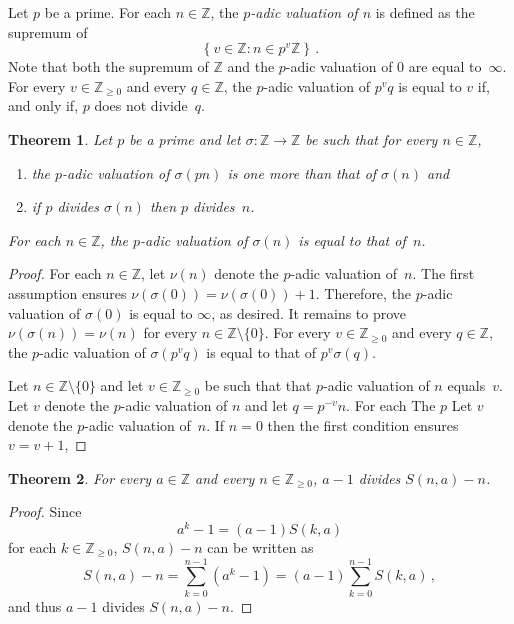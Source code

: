 \documentclass[12pt]{article}
\newcommand{\bZ}{\mathbb{Z}}
\newcommand{\bN}{\bZ_{\ge 0}}%
\newtheorem{theorem}{Theorem}
\theoremstyle{definition}
\begin{document}
Let $p$ be a prime.
For each $n \in \bZ$, the \emph{$p$-adic valuation of $n$} is defined as the supremum of
$$
 \left\{ v \in \bZ : n \in p^v \bZ \right\} \, .
$$
Note that both the supremum of $\bZ$ and the $p$-adic valuation of $0$ are equal to~$\infty$.
For every $v \in \bN$ and every $q \in \bZ$,
the $p$-adic valuation of $p^v q$ is equal to $v$ if, and only if, $p$ does not divide~$q$.

\begin{theorem}
  Let $p$ be a prime and let $\sigma\colon \bZ \to \bZ$ be such that for every $n \in \bZ$,
  \begin{enumerate}
  \item the $p$-adic valuation of $\sigma(pn)$ is one more than that of $\sigma(n)$ and 
  \item if $p$ divides $\sigma(n)$ then $p$ divides~$n$.
  \end{enumerate} 
For each $n \in \bZ$, the $p$-adic valuation of $\sigma(n)$ is equal to that of~$n$.    
\end{theorem}

\begin{proof}
  For each $n \in \bZ$, let $\nu(n)$ denote the $p$-adic valuation of~$n$.
  The first assumption ensures $\nu(\sigma(0)) = \nu(\sigma(0)) + 1$.
  Therefore, the $p$-adic valuation of $\sigma(0)$ is equal to $\infty$, as desired.
  It remains to prove $\nu(\sigma(n)) = \nu(n)$ for every $n \in \bZ \setminus \{ 0 \}$.
  For every $v \in \bN$ and every $q \in \bZ$,
  the $p$-adic valuation of $\sigma(p^v q)$ is equal to that of $p^v \sigma(q)$. 
  
  Let $n \in \bZ \setminus \{ 0 \}$ and let $v \in \bN$ be such that that $p$-adic valuation of $n$ equals~$v$.
  Let $v$ denote the $p$-adic valuation of $n$ and let $q = p^{- v} n$.
  For each The $p$
  Let $v$ denote the $p$-adic valuation of~$n$.
  If $n = 0$ then the first condition ensures $v = v + 1$,
\end{proof}

\begin{theorem} \label{thm:a-1-divides-Sna-n}
  For every $a \in \bZ$ and every $n \in \bN$,
  $a - 1$ divides $S(n, a) - n$.
\end{theorem}

\begin{proof}
  Since %
  $$
  a^k - 1 = (a - 1) S(k, a)
  $$
  for each $k \in \bN$,
  $S(n, a) - n$ can be written as
  $$
  S(n, a) - n = \sum_{k = 0}^{n - 1} (a^k - 1) = (a - 1) \sum_{k = 0}^{n - 1} S(k, a)  \, ,
  $$
   and thus  $a - 1$ divides $S(n, a) - n$.
\end{proof} 
\end{document}
